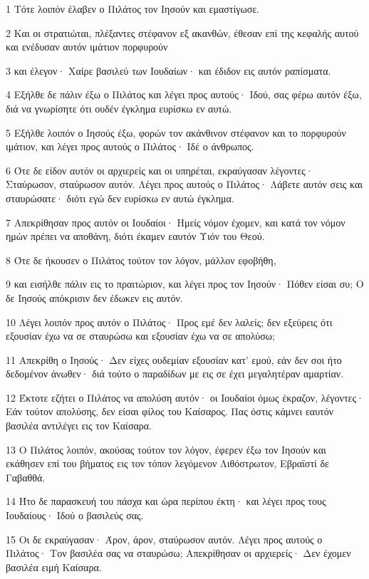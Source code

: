 \par 1 Τότε λοιπόν έλαβεν ο Πιλάτος τον Ιησούν και εμαστίγωσε.
\par 2 Και οι στρατιώται, πλέξαντες στέφανον εξ ακανθών, έθεσαν επί της κεφαλής αυτού και ενέδυσαν αυτόν ιμάτιον πορφυρούν
\par 3 και έλεγον· Χαίρε βασιλεύ των Ιουδαίων· και έδιδον εις αυτόν ραπίσματα.
\par 4 Εξήλθε δε πάλιν έξω ο Πιλάτος και λέγει προς αυτούς· Ιδού, σας φέρω αυτόν έξω, διά να γνωρίσητε ότι ουδέν έγκλημα ευρίσκω εν αυτώ.
\par 5 Εξήλθε λοιπόν ο Ιησούς έξω, φορών τον ακάνθινον στέφανον και το πορφυρούν ιμάτιον, και λέγει προς αυτούς ο Πιλάτος· Ιδέ ο άνθρωπος.
\par 6 Ότε δε είδον αυτόν οι αρχιερείς και οι υπηρέται, εκραύγασαν λέγοντες· Σταύρωσον, σταύρωσον αυτόν. Λέγει προς αυτούς ο Πιλάτος· Λάβετε αυτόν σεις και σταυρώσατε· διότι εγώ δεν ευρίσκω εν αυτώ έγκλημα.
\par 7 Απεκρίθησαν προς αυτόν οι Ιουδαίοι· Ημείς νόμον έχομεν, και κατά τον νόμον ημών πρέπει να αποθάνη, διότι έκαμεν εαυτόν Υιόν του Θεού.
\par 8 Ότε δε ήκουσεν ο Πιλάτος τούτον τον λόγον, μάλλον εφοβήθη,
\par 9 και εισήλθε πάλιν εις το πραιτώριον, και λέγει προς τον Ιησούν· Πόθεν είσαι συ; Ο δε Ιησούς απόκρισιν δεν έδωκεν εις αυτόν.
\par 10 Λέγει λοιπόν προς αυτόν ο Πιλάτος· Προς εμέ δεν λαλείς; δεν εξεύρεις ότι εξουσίαν έχω να σε σταυρώσω και εξουσίαν έχω να σε απολύσω;
\par 11 Απεκρίθη ο Ιησούς· Δεν είχες ουδεμίαν εξουσίαν κατ' εμού, εάν δεν σοι ήτο δεδομένον άνωθεν· διά τούτο ο παραδίδων με εις σε έχει μεγαλητέραν αμαρτίαν.
\par 12 Έκτοτε εζήτει ο Πιλάτος να απολύση αυτόν· οι Ιουδαίοι όμως έκραζον, λέγοντες· Εάν τούτον απολύσης, δεν είσαι φίλος του Καίσαρος. Πας όστις κάμνει εαυτόν βασιλέα αντιλέγει εις τον Καίσαρα.
\par 13 Ο Πιλάτος λοιπόν, ακούσας τούτον τον λόγον, έφερεν έξω τον Ιησούν και εκάθησεν επί του βήματος εις τον τόπον λεγόμενον Λιθόστρωτον, Εβραϊστί δε Γαβαθθά.
\par 14 Ήτο δε παρασκευή του πάσχα και ώρα περίπου έκτη· και λέγει προς τους Ιουδαίους· Ιδού ο βασιλεύς σας.
\par 15 Οι δε εκραύγασαν· Άρον, άρον, σταύρωσον αυτόν. Λέγει προς αυτούς ο Πιλάτος· Τον βασιλέα σας να σταυρώσω; Απεκρίθησαν οι αρχιερείς· Δεν έχομεν βασιλέα ειμή Καίσαρα.
